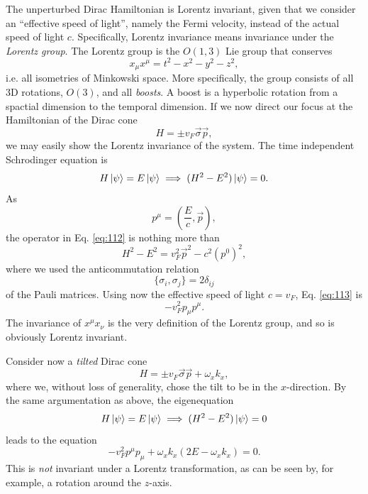 The unperturbed Dirac Hamiltonian is Lorentz invariant, given that we consider an ``effective speed of light'', namely the Fermi velocity, instead of the actual speed of light \( c \).
Specifically, Lorentz invariance means invariance under the \emph{Lorentz group}.
The Lorentz group is the \( O(1,3) \) Lie group that conserves
\[
x_{\mu } x^{\mu } = t^2 - x^2 - y^2 - z^2,
\]
i.e. all isometries of Minkowski space.
More specifically, the group consists of all 3D rotations, \( O(3) \), and all \emph{boosts}.
A boost is a hyperbolic rotation from a spactial dimension to the temporal dimension.
If we now direct our focus at the Hamiltonian of the Dirac cone
\[
H = \pm v_{F} \vec{\sigma} \vec{p},
\]
we may easily show the Lorentz invariance of the system.
The time independent Schrodinger equation is
\begin{equation}
  \label{eq:112}
  H \ket{\psi } = E \ket{\psi } \implies (H^2 - E^2) \ket{\psi } = 0.
\end{equation}
As
\[
p^{\mu } = \left(\frac{E}{c}, \vec{p}\right),
\]
the operator in Eq. \eqref{eq:112} is nothing more than
\begin{equation}
  \label{eq:113}
  H^2-E^2 = v_{F}^2 \vec{p}^2 - c^2 \left(p^0\right)^2 ,
\end{equation}
where we used the anticommutation relation
\[
\{\sigma_{i}, \sigma_{j}\} =  2 \delta _{ij}
\]
of the Pauli matrices.
Using now the effective speed of light \( c=v_F \), Eq. \eqref{eq:113} is
\begin{equation}
  \label{eq:114}
  - v_F^2 p_{\mu } p^{\mu }.
\end{equation}
The invariance of \( x^{\mu} x_{\nu} \) is the very definition of the Lorentz group, and so is obviously Lorentz invariant.

Consider now a \emph{tilted} Dirac cone
\begin{equation}
  \label{eq:115}
  H = \pm v_F \vec{\sigma} \vec{p} + \omega_x k_x,
\end{equation}
where we, without loss of generality, chose the tilt to be in the \( x \)-direction.
By the same argumentation as above, the eigenequation
\[
  H \ket{\psi} = E\ket{\psi} \implies (H^2 - E^2)\ket{\psi} = 0
\]
leads to the equation
\begin{equation}
  \label{eq:116}
  -v_F^2 p^{\mu} p_{\mu} + \omega_{x} k_x (2 E - \omega_x k_x) = 0.
\end{equation}
This is \emph{not} invariant under a Lorentz transformation, as can be seen by, for example, a rotation around the \( z \)-axis.

